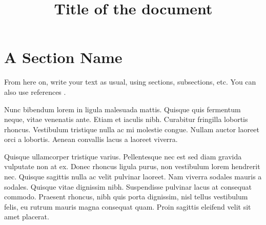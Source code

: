 \documentclass[12pt,english]{nserc-appendix}
\begin{document}
\title{Title of the document}

\setcounter{page}{7}
\maketitle

\section{A Section Name}

From here on, write your text as usual, using sections, subsections,
etc. You can also use references
\cite{DBLPjournals/jsyml/Turing48,DBLPconf/afips/SolomonP76}.

Nunc bibendum lorem in ligula malesuada mattis. Quisque quis fermentum
neque, vitae venenatis ante. Etiam et iaculis nibh. Curabitur fringilla
lobortis rhoncus. Vestibulum tristique nulla ac mi molestie congue. Nullam
auctor laoreet orci a lobortis. Aenean convallis lacus a laoreet viverra.

Quisque ullamcorper tristique varius. Pellentesque nec est sed diam gravida
vulputate non at ex. Donec rhoncus ligula purus, non vestibulum lorem
hendrerit nec. Quisque sagittis nulla ac velit pulvinar laoreet. Nam viverra
sodales mauris a sodales. Quisque vitae dignissim nibh. Suspendisse pulvinar
lacus at consequat commodo. Praesent rhoncus, nibh quis porta dignissim,
nisl tellus vestibulum felis, eu rutrum mauris magna consequat quam. Proin
sagittis eleifend velit sit amet placerat.

\newpage
\pagestyle{plain}


\end{document}
